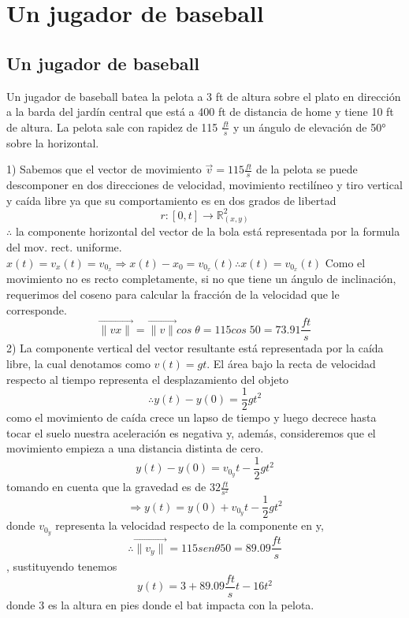 \chapter*{Un jugador de baseball}
\section*{Un jugador de baseball}
    Un jugador de baseball batea la pelota a 3 ft de altura sobre el plato en dirección a la barda del jardín central que está a 400 ft de distancia de home y tiene 10 ft de altura. La pelota sale con rapidez de 115 $\frac{ft}{s}$ y un ángulo de elevación de 50° sobre la horizontal.
    
    1) Sabemos que el vector de movimiento $\vec{v}=115\frac{ft}{s}$ de la pelota se puede descomponer en dos direcciones de velocidad, movimiento rectilíneo y tiro vertical y caída libre ya que su comportamiento es en dos grados de libertad $$r:\left[0,t\right]\rightarrow \mathbb{R}^2_{(x,y)}$$
    $\therefore$ la componente horizontal del  vector de la bola está representada por la formula del mov. rect. uniforme.$x(t)=v_x(t)=v_{0_x}\Rightarrow x(t)-x_{0}=v_{0_x}(t)\therefore x(t)=v_{0_x}(t)$
    Como el movimiento no es recto completamente, si no que tiene un ángulo de inclinación, requerimos del coseno para calcular la fracción de la velocidad que le corresponde. $$\vec{\|vx\|}=\vec{\|v\|}cos\;\theta = 115cos\;50 = 73.91\frac{ft}{s}$$
    2) La componente vertical del vector resultante está representada por la caída libre, la cual denotamos como $v(t)=gt$.
    El área bajo la recta de velocidad respecto al tiempo representa el desplazamiento del objeto $$\therefore y(t)-y(0)=\frac{1}{2}gt^2$$
    como el movimiento de caída crece un lapso de tiempo y luego decrece hasta tocar el suelo nuestra aceleración es negativa y, además, consideremos que el movimiento empieza a una distancia distinta de cero.$$y(t)-y(0)=v_{0_y}t-\frac{1}{2}gt^2$$ tomando en cuenta que la gravedad es de $32\frac{ft}{s^2}$ $$\Rightarrow y(t)=y(0)+v_{0_y}t-\frac{1}{2}gt^2$$ donde $v_{0_y}$ representa la velocidad respecto de la componente en y, $$\therefore \vec{\|v_y\|}=115 sen\theta 50=89.09\frac{ft}{s}$$, sustituyendo tenemos$$y(t)=3+89.09\frac{ft}{s}t-16t^2$$ donde 3 es la altura en pies donde el bat impacta con la pelota.
    
    \vspace{5mm} %
    
